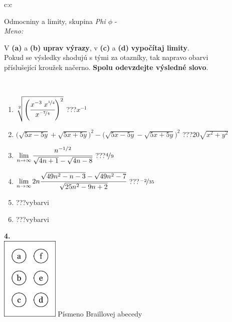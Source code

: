 \documentclass[10pt]{report}
\begin{document}
\begin{tabular}{c:c}
\begin{minipage}[c][104.5mm][t]{0.5\linewidth}
\begin{center}
{\huge Odmocniny a limity, skupina \textit{Phi $\phi$} -}\\[5mm]
\textit{Meno:}\phantom{xxxxxxxxxxxxxxxxxxxxxxxxxxxxxxxxxxxxxxxxxxxxxxxxxxxxxxxxxxxxxxxxx}\\[5mm]
\begin{minipage}{0.95\linewidth}
\begin{center}
V \textbf{(a)} a \textbf{(b)} \textbf{uprav výrazy}, v \textbf{(c)} a \textbf{(d)} \textbf{vypočítaj limity}.\\Pokud se výsledky shodujú s tými za otazníky, tak napravo obarvi\\příslušející kroužek načerno. \textbf{Spolu odevzdejte výsledné slovo}.
\end{center}
\end{minipage}
\\[1mm]
\begin{minipage}{0.79\linewidth}
\begin{center}
\begin{varwidth}{\linewidth}
\begin{enumerate}
\small
\item $\sqrt[2]{\left(\cfrac{x^{-3}\;x^{\nicefrac{1}{4}}}{x^{\nicefrac{-7}{4}}}\right)^{2}}$\quad \dotfill\; ???\;\dotfill \quad $x^{-1}$
\item {\footnotesize{\scriptsize$\big(\sqrt{5x-5y}+\sqrt{5x+5y}\big)^2-\big(\sqrt{5x-5y}-\sqrt{5x+5y}\big)^2$}\quad \dotfill\; ???\;\dotfill \quad $20\sqrt{x^2+y^2}$}
\item $\lim\limits_{n\to\infty}\cfrac{n^{-1/2}}{\sqrt{4n+1}-\sqrt{4n-8}}$\quad \dotfill\; ???\;\dotfill \quad $\nicefrac{4}{9}$
\item $\lim\limits_{n\to\infty}2n\cfrac{\sqrt{49n^2-n-3}-\sqrt{49n^2-7}}{\sqrt{25n^2-9n+2}}$\quad \dotfill\; ???\;\dotfill \quad $\nicefrac{-2}{35}$
\item \quad \dotfill\; ???\;\dotfill \quad vybarvi
\item \quad \dotfill\; ???\;\dotfill \quad vybarvi
\end{enumerate}
\end{varwidth}
\end{center}
\end{minipage}
\begin{minipage}{0.20\linewidth}
\begin{center}
{\Huge\bfseries 4.} \\[2mm]
\includegraphics[height=40mm]{../images/braille.png}
{\small Písmeno Braillovej abecedy}
\end{center}
\end{minipage}
\end{center}
\end{minipage}
%
\end{tabular}
\end{document}
